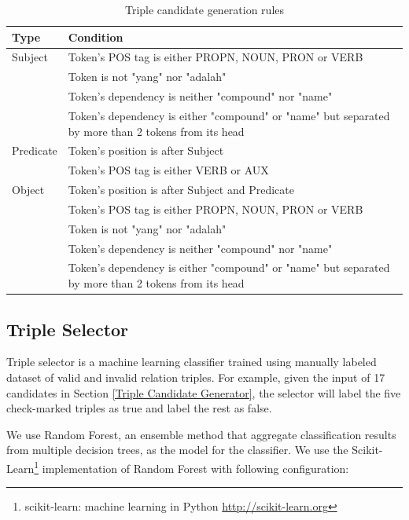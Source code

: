 \documentclass[conference,compsoc,12pt]{IEEEtran}
\begin{document}
\begin{table}[!t]
\renewcommand{\arraystretch}{1.5}
\caption{Triple candidate generation rules}
\label{table_triple_candidate_generation_rules}
\centering
\begin{tabular}{l p{6cm}}
\hline
\textbf{Type} & \textbf{Condition} \\
\hline
Subject & Token's POS tag is either PROPN, NOUN, PRON or VERB \\
\space & Token is not "yang" nor "adalah" \\
\space & Token's dependency is neither "compound" nor "name" \\
\space & Token's dependency is either "compound" or "name" but separated by more than 2 tokens from its head \\
\hline
Predicate & Token's position is after Subject \\
\space & Token's POS tag is either VERB or AUX \\
\hline
Object & Token's position is after Subject and Predicate \\
\space & Token's POS tag is either PROPN, NOUN, PRON or VERB \\
\space & Token is not "yang" nor "adalah" \\
\space & Token's dependency is neither "compound" nor "name" \\
\space & Token's dependency is either "compound" or "name" but separated by more than 2 tokens from its head \\
\end{tabular}
\end{table}


\subsection{Triple Selector}  \label{Triple Selector}

Triple selector is a machine learning classifier trained using manually labeled dataset of valid and invalid relation triples. For example, given the input of 17 candidates in Section \ref{Triple Candidate Generator}, the selector will label the five check-marked triples as true and label the rest as false.

We use Random Forest\cite{breiman2001random}, an ensemble method that aggregate classification results from multiple decision trees, as the model for the classifier. We use the Scikit-Learn\footnote{scikit-learn: machine learning in Python \url{http://scikit-learn.org}} implementation of Random Forest with following configuration:
\end{document}
